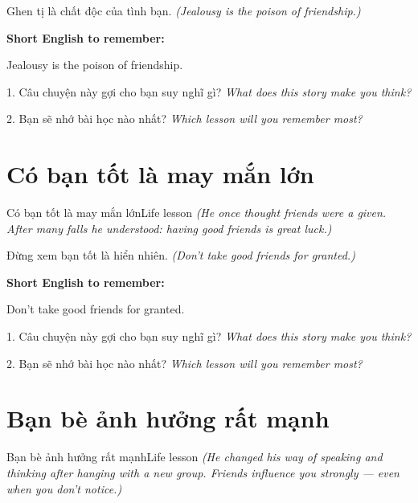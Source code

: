 \begin{baihoc}
Ghen tị là chất độc của tình bạn.
\textit{(Jealousy is the poison of friendship.)}
\end{baihoc}

\begin{ghinhoanh}
\textbf{Short English to remember:}

Jealousy is the poison of friendship.

\end{ghinhoanh}

\begin{tuhocnhanh}
1. Câu chuyện này gợi cho bạn suy nghĩ gì? \textit{What does this story make you think?}

2. Bạn sẽ nhớ bài học nào nhất? \textit{Which lesson will you remember most?}
\end{tuhocnhanh}
\ngancach


\section{Có bạn tốt là may mắn lớn}
\begin{truyen}{Có bạn tốt là may mắn lớn}{Life lesson}
\textit{(He once thought friends were a given. After many falls he understood: having good friends is great luck.)}
\end{truyen}

\begin{baihoc}
Đừng xem bạn tốt là hiển nhiên.
\textit{(Don't take good friends for granted.)}
\end{baihoc}

\begin{ghinhoanh}
\textbf{Short English to remember:}

Don't take good friends for granted.

\end{ghinhoanh}

\begin{tuhocnhanh}
1. Câu chuyện này gợi cho bạn suy nghĩ gì? \textit{What does this story make you think?}

2. Bạn sẽ nhớ bài học nào nhất? \textit{Which lesson will you remember most?}
\end{tuhocnhanh}
\ngancach


\section{Bạn bè ảnh hưởng rất mạnh}
\begin{truyen}{Bạn bè ảnh hưởng rất mạnh}{Life lesson}
\textit{(He changed his way of speaking and thinking after hanging with a new group. Friends influence you strongly — even when you don't notice.)}
\end{truyen}

